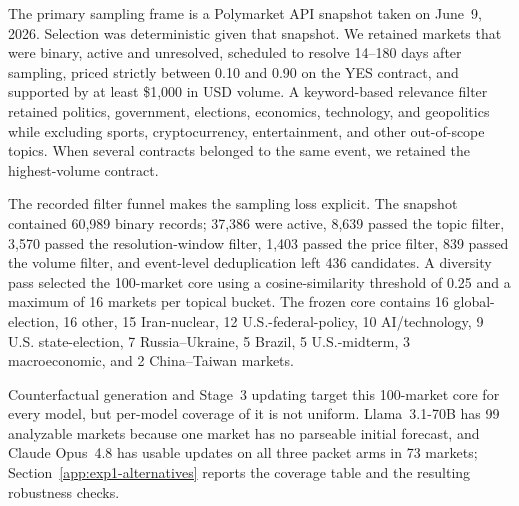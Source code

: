 The primary sampling frame is a Polymarket API snapshot taken on June~9, 2026.
Selection was deterministic given that snapshot.  We retained markets that were
binary, active and unresolved, scheduled to resolve 14--180 days after sampling,
priced strictly between 0.10 and 0.90 on the YES contract, and supported by at least
\$1,000 in USD volume.  A keyword-based relevance filter retained politics,
government, elections, economics, technology, and geopolitics while excluding
sports, cryptocurrency, entertainment, and other out-of-scope topics.  When several
contracts belonged to the same event, we retained the highest-volume contract.

The recorded filter funnel makes the sampling loss explicit.  The snapshot contained
60,989 binary records; 37,386 were active, 8,639 passed the topic filter, 3,570 passed
the resolution-window filter, 1,403 passed the price filter, 839 passed the volume
filter, and event-level deduplication left 436 candidates.  A diversity pass selected
the 100-market core using a cosine-similarity threshold of 0.25 and a maximum of
16 markets per topical bucket.  The frozen core contains 16 global-election,
16 other, 15 Iran-nuclear, 12 U.S.-federal-policy, 10 AI/technology, 9 U.S.
state-election, 7 Russia--Ukraine, 5 Brazil, 5 U.S.-midterm, 3 macroeconomic,
and 2 China--Taiwan markets.

Counterfactual generation and Stage~3 updating target this 100-market core for
every model, but per-model coverage of it is not uniform. Llama~3.1-70B has 99
analyzable markets because one market has no parseable initial forecast, and
Claude Opus~4.8 has usable updates on all three packet arms in 73 markets;
Section~\ref{app:exp1-alternatives} reports the coverage table and the resulting
robustness checks.

\begin{center}
\begin{minipage}{\linewidth}
\centering
{}
\label{tab:markets}
\footnotesize
{}
\end{minipage}
\end{center}

